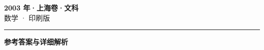 \documentclass[zihao=5, a4paper]{ctexart}
\begin{document}
\begin{center}
  {\Large\bfseries 2003 年·上海卷·文科}\\[4pt]
  {\large 数学 · 印刷版}
\end{center}
\medskip
{}

\par\bigskip\hrule\bigskip
{}
\begin{center}{\large\bfseries 参考答案与详细解析}\end{center}
\smallskip

\end{document}
